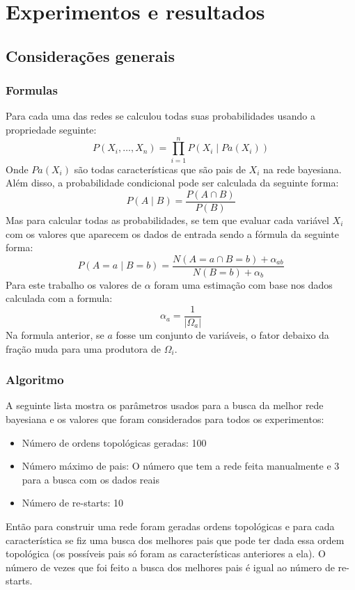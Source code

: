 \section{Experimentos e resultados}

\subsection{Considerações generais}
	\subsubsection{Formulas}
		Para cada uma das redes se calculou todas suas probabilidades usando a propriedade seguinte:
			\[ P( X_i , \ldots , X_n ) = \prod_{i=1}^{n} P( X_i \mid {Pa}( X_i ) ) \]
		Onde ${Pa}( X_i )$ são todas características que são pais de $X_i$ na rede bayesiana. Além disso, a probabilidade condicional pode ser calculada da seguinte forma:
			\[ P( A \mid B ) = \frac{ P( A \cap B ) }{ P( B ) }\]
		Mas para calcular todas as probabilidades, se tem que evaluar cada variável $X_i$ com os valores que aparecem os dados de entrada sendo a fórmula da seguinte forma:
			\[ P( A = a \mid B = b ) = \frac{ N( A = a \cap B = b ) + \alpha_{ab} }{N( B = b ) + \alpha_b } \]
		Para este trabalho os valores de $\alpha$ foram uma estimação com base nos dados calculada com a formula:
			\[ \alpha_{a} = \frac{ 1 }{ |\Omega_a|} \]
		Na formula anterior, se $a$ fosse um conjunto de variáveis, o fator debaixo da fração muda para uma produtora de $\Omega_i$.
	
	\subsubsection{Algoritmo}
		A seguinte lista mostra os parâmetros usados para a busca da melhor rede bayesiana e os valores que foram considerados para todos os experimentos:
		\begin{itemize}
			\item Número de ordens topológicas geradas: 100
			\item Número máximo de pais: O número que tem a rede feita manualmente e 3 para a busca com os dados reais
			\item Número de re-starts: 10
		\end{itemize}
		Então para construir uma rede foram geradas ordens topológicas e para cada característica se fiz uma busca dos melhores pais que pode ter dada essa ordem topológica (os possíveis pais só foram as características anteriores a ela). O número de vezes que foi feito a busca dos melhores pais é igual ao número de re-starts.


